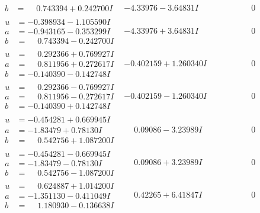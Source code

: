 \documentclass[1p]{elsarticle_modified}
\theoremstyle{definition}
\begin{document}
$$\begin{array}{c|c|c}
\begin{aligned}
b &= \phantom{-}0.743394 + 0.242700 I\end{aligned}
 & -4.33976 - 3.64831 I & \phantom{-0.000000 } 0 \\ \hline\begin{aligned}
u &= -0.398934 - 1.105590 I \\
a &= -0.943165 - 0.353299 I \\
b &= \phantom{-}0.743394 - 0.242700 I\end{aligned}
 & -4.33976 + 3.64831 I & \phantom{-0.000000 } 0 \\ \hline\begin{aligned}
u &= \phantom{-}0.292366 + 0.769927 I \\
a &= \phantom{-}0.811956 + 0.272617 I \\
b &= -0.140390 - 0.142748 I\end{aligned}
 & -0.402159 + 1.260340 I & \phantom{-0.000000 } 0 \\ \hline\begin{aligned}
u &= \phantom{-}0.292366 - 0.769927 I \\
a &= \phantom{-}0.811956 - 0.272617 I \\
b &= -0.140390 + 0.142748 I\end{aligned}
 & -0.402159 - 1.260340 I & \phantom{-0.000000 } 0 \\ \hline\begin{aligned}
u &= -0.454281 + 0.669945 I \\
a &= -1.83479 + 0.78130 I \\
b &= \phantom{-}0.542756 + 1.087200 I\end{aligned}
 & \phantom{-}0.09086 - 3.23989 I & \phantom{-0.000000 } 0 \\ \hline\begin{aligned}
u &= -0.454281 - 0.669945 I \\
a &= -1.83479 - 0.78130 I \\
b &= \phantom{-}0.542756 - 1.087200 I\end{aligned}
 & \phantom{-}0.09086 + 3.23989 I & \phantom{-0.000000 } 0 \\ \hline\begin{aligned}
u &= \phantom{-}0.624887 + 1.014200 I \\
a &= -1.351130 - 0.411049 I \\
b &= \phantom{-}1.180930 - 0.136638 I\end{aligned}
 & \phantom{-}0.42265 + 6.41847 I & \phantom{-0.000000 } 0 \\ \hline\begin{aligned}

\end{aligned}
\end{array}$$
\end{document}
